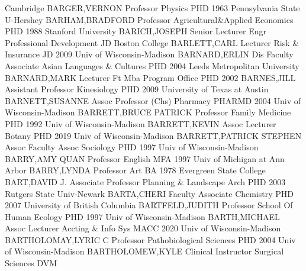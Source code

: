\documentclass[
]{article}
\begin{document}
Cambridge \textbar BARGER,VERNON \textbar{} 
\textbar Professor \textbar Physics \textbar PHD 1963 Pennsylvania State
U-Hershey \textbar BARHAM,BRADFORD \textbar{} 
\textbar Professor \textbar Agricultural\&Applied Economics \textbar PHD
1988 Stanford University \textbar BARICH,JOSEPH \textbar{} 
\textbar Senior Lecturer \textbar Engr Professional Development
\textbar JD Boston College \textbar BARLETT,CARL \textbar{} 
\textbar Lecturer \textbar Risk \& Insurance \textbar JD 2009 Univ of
Wisconsin-Madison \textbar BARNARD,ERLIN \textbar{} 
\textbar Dis Faculty Associate \textbar Asian Languages \& Cultures
\textbar PHD 2004 Leeds Metropolitan University \textbar BARNARD,MARK
\textbar{}  \textbar Lecturer \textbar Ft Mba Program Office
\textbar PHD 2002 \textbar BARNES,JILL \textbar{} 
\textbar Assistant Professor \textbar Kinesiology \textbar PHD 2009
University of Texas at Austin \textbar BARNETT,SUSANNE \textbar{}
 \textbar Assoc Professor (Chs) \textbar Pharmacy
\textbar PHARMD 2004 Univ of Wisconsin-Madison \textbar BARRETT,BRUCE
PATRICK \textbar{}  \textbar Professor \textbar Family
Medicine \textbar PHD 1992 Univ of Wisconsin-Madison
\textbar BARRETT,KEVIN \textbar{}  \textbar Assoc Lecturer
\textbar Botany \textbar PHD 2019 Univ of Wisconsin-Madison
\textbar BARRETT,PATRICK STEPHEN \textbar{}  \textbar Assoc
Faculty Assoc \textbar Sociology \textbar PHD 1997 Univ of
Wisconsin-Madison \textbar BARRY,AMY QUAN \textbar{} 
\textbar Professor \textbar English \textbar MFA 1997 Univ of Michigan
at Ann Arbor \textbar BARRY,LYNDA \textbar{} 
\textbar Professor \textbar Art \textbar BA 1978 Evergreen State College
\textbar BART,DAVID J. \textbar{}  \textbar Associate
Professor \textbar Planning \& Landscape Arch \textbar PHD 2003 Rutgers
State Univ-Newark \textbar BARTA,CHERI \textbar{} 
\textbar Faculty Associate \textbar Chemistry \textbar PHD 2007
University of British Columbia \textbar BARTFELD,JUDITH \textbar{}
 \textbar Professor \textbar School Of Human Ecology
\textbar PHD 1997 Univ of Wisconsin-Madison \textbar BARTH,MICHAEL
\textbar{}  \textbar Assoc Lecturer \textbar Accting \& Info
Sys \textbar MACC 2020 Univ of Wisconsin-Madison
\textbar BARTHOLOMAY,LYRIC C \textbar{}  \textbar Professor
\textbar Pathobiological Sciences \textbar PHD 2004 Univ of
Wisconsin-Madison \textbar BARTHOLOMEW,KYLE \textbar{} 
\textbar Clinical Instructor \textbar Surgical Sciences \textbar DVM
\end{document}
